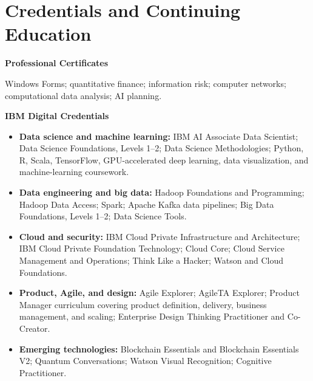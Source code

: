 \section{Credentials and Continuing Education}
\label{sec:credentials_and_continuing_education}

\textbf{Professional Certificates}\par
{}

\smallskip
{}
Windows Forms; quantitative finance; information risk; computer networks; computational data analysis; AI planning.

\smallskip
\textbf{IBM Digital Credentials}\par
{}
\begin{itemize}
  \item \textbf{Data science and machine learning:} IBM AI Associate Data Scientist; Data Science Foundations, Levels 1--2; Data Science Methodologies; Python, R, Scala, TensorFlow, GPU-accelerated deep learning, data visualization, and machine-learning coursework.
  \item \textbf{Data engineering and big data:} Hadoop Foundations and Programming; Hadoop Data Access; Spark; Apache Kafka data pipelines; Big Data Foundations, Levels 1--2; Data Science Tools.
  \item \textbf{Cloud and security:} IBM Cloud Private Infrastructure and Architecture; IBM Cloud Private Foundation Technology; Cloud Core; Cloud Service Management and Operations; Think Like a Hacker; Watson and Cloud Foundations.
  \item \textbf{Product, Agile, and design:} Agile Explorer; AgileTA Explorer; Product Manager curriculum covering product definition, delivery, business management, and scaling; Enterprise Design Thinking Practitioner and Co-Creator.
  \item \textbf{Emerging technologies:} Blockchain Essentials and Blockchain Essentials V2; Quantum Conversations; Watson Visual Recognition; Cognitive Practitioner.
\end{itemize}

